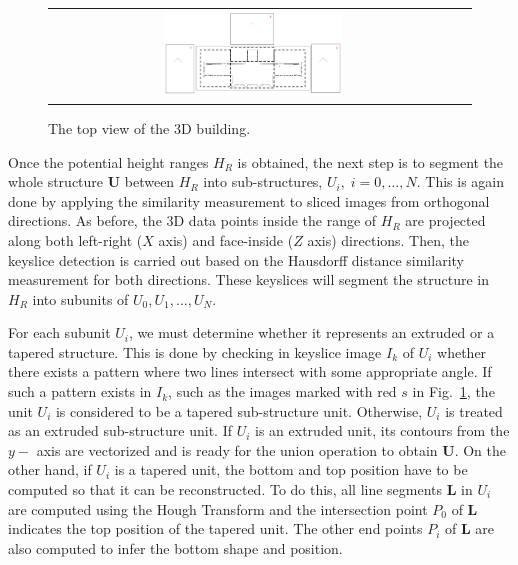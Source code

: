 \documentclass[review]{acmsiggraph}       %
\newcommand{\Fig}[1]{Fig.~\ref{fig:#1}}
\begin{document}
\begin{figure}[htbp]
\begin{center}
\begin{tabular}{cc}
\includegraphics[width=0.45\textwidth]{extrude_3.png} \\
\end{tabular}
\end{center}
\caption{The top view of the 3D building. }
\label{fig:taper_seg}
\end{figure}

Once the potential height ranges $H_R$ is obtained, the next step is to
segment the whole structure $\boldsymbol{U}$ between $H_R$ into sub-structures,
$U_i, \; i = 0,\ldots,N$.
This is again done by applying the similarity measurement to sliced images
from orthogonal directions.
As before, the 3D data points inside the range of $H_R$ are projected
along both left-right ($X$ axis) and face-inside ($Z$ axis) directions.
Then, the keyslice detection is carried out based on the Hausdorff distance
similarity measurement for both directions.
These keyslices will segment the structure in $H_R$ into subunits of
$U_0, U_1, \ldots, U_N$.

For each subunit $U_i$, we must determine whether it represents an extruded or
a tapered structure.
This is done by checking in keyslice image $I_k$ of $U_i$ whether there exists
a pattern where two lines intersect with some appropriate angle.
If such a pattern exists in $I_k$, such as the images marked with red $s$ in
\Fig{taper_seg}, the unit $U_i$ is considered to be a tapered sub-structure unit.
Otherwise, $U_i$ is treated as an extruded sub-structure unit.
If $U_i$ is an extruded unit, its contours from the $y-$ axis are vectorized
and is ready for the union operation to obtain $\boldsymbol{U}$.
On the other hand, if $U_i$ is a tapered unit, the bottom and top position
have to be computed so that it can be reconstructed.
To do this, all line segments $\boldsymbol{L}$ in $U_i$ are computed using
the Hough Transform and the intersection point $P_0$ of $\boldsymbol{L}$
indicates the top position of the tapered unit.
The other end points $P_i$ of $\boldsymbol{L}$ are also computed to infer
the bottom shape and position.
\end{document}
